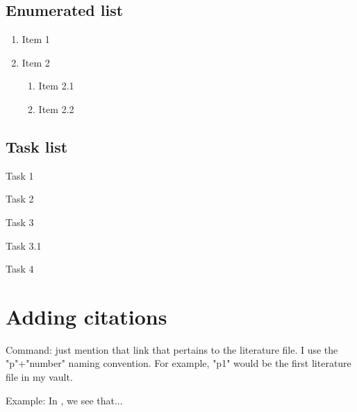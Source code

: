 \documentclass{extarticle}
\begin{document}
\subsection{Enumerated list}

\begin{enumerate}

\item Item 1

\item Item 2

\begin{enumerate}

\item Item 2.1

\item Item 2.2

\end{enumerate}

\end{enumerate}



\subsection{Task list}

\begin{todolist}

\item Task 1

\item Task 2

\item Task 3

\begin{todolist}

\item Task 3.1

\end{todolist}

\item Task 4

\end{todolist}

\section{Adding citations}
Command: just mention that link that pertains to the literature file. I use the "p"+"number" naming convention. For example, "p1" would be the first literature file in my vault.



Example: In \cite{p1}, we see that...  \hypertarget{ad3b86}{}
\end{document}
